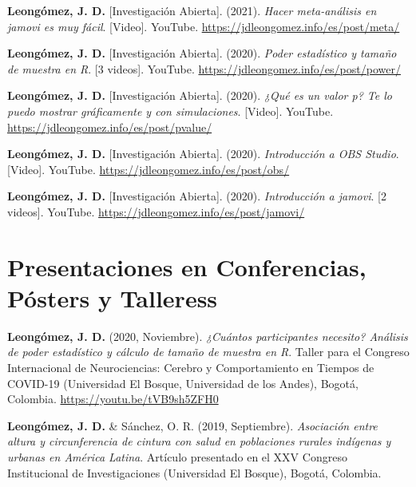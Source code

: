 \documentclass[11pt, a4paper]{awesome-cv}
\begin{document}
\hypertarget{refs_IA}{}
\leavevmode{}%
\textbf{Leongómez, J. D.} {[}Investigación Abierta{]}. (2021).
\emph{{Hacer meta-análisis en jamovi es muy fácil}}. {[}Video{]}.
YouTube. \url{https://jdleongomez.info/es/post/meta/}

\leavevmode{}%
\textbf{Leongómez, J. D.} {[}Investigación Abierta{]}. (2020).
\emph{{Poder estadístico y tamaño de muestra en R}}. {[}3 videos{]}.
YouTube. \url{https://jdleongomez.info/es/post/power/}

\leavevmode{}%
\textbf{Leongómez, J. D.} {[}Investigación Abierta{]}. (2020).
\emph{{¿Qué es un valor p? Te lo puedo mostrar gráficamente y con
simulaciones}}. {[}Video{]}. YouTube.
\url{https://jdleongomez.info/es/post/pvalue/}

\leavevmode{}%
\textbf{Leongómez, J. D.} {[}Investigación Abierta{]}. (2020).
\emph{{Introducción a OBS Studio}}. {[}Video{]}. YouTube.
\url{https://jdleongomez.info/es/post/obs/}

\leavevmode{}%
\textbf{Leongómez, J. D.} {[}Investigación Abierta{]}. (2020).
\emph{{Introducción a jamovi}}. {[}2 videos{]}. YouTube.
\url{https://jdleongomez.info/es/post/jamovi/}

\endgroup

\hypertarget{presentaciones-en-conferencias-puxf3sters-y-talleress}{%
\section{Presentaciones en Conferencias, Pósters y
Talleress}\label{presentaciones-en-conferencias-puxf3sters-y-talleress}}

\begingroup
\setlength{\parindent}{-0.5in}
\setlength{\leftskip}{0.5in}

\textbf{Leongómez, J. D.} (2020, Noviembre). \emph{¿Cuántos
participantes necesito? Análisis de poder estadístico y cálculo de
tamaño de muestra en R}. Taller para el Congreso Internacional de
Neurociencias: Cerebro y Comportamiento en Tiempos de COVID-19
(Universidad El Bosque, Universidad de los Andes), Bogotá, Colombia.
\url{https://youtu.be/tVB9sh5ZFH0}

\textbf{Leongómez, J. D.} \& Sánchez, O. R. (2019, Septiembre).
\emph{Asociación entre altura y circunferencia de cintura con salud en
poblaciones rurales indígenas y urbanas en América Latina}. Artículo
presentado en el XXV Congreso Institucional de Investigaciones
(Universidad El Bosque), Bogotá, Colombia.
\end{document}
